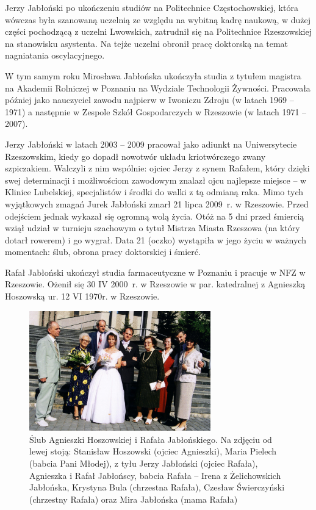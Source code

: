 Jerzy Jabłoński po ukończeniu studiów na Politechnice Częstochowskiej, która wówczas była szanowaną uczelnią ze względu na wybitną kadrę naukową, w dużej części pochodzącą z uczelni Lwowskich, zatrudnił się na Politechnice Rzeszowskiej na stanowisku asystenta. Na tejże uczelni obronił pracę doktorską na temat nagniatania oscylacyjnego. 

W tym samym roku Mirosława Jabłońska ukończyła studia z tytułem magistra na Akademii Rolniczej w Poznaniu na Wydziale Technologii Żywności. Pracowała później jako nauczyciel zawodu najpierw w Iwoniczu Zdroju (w latach 1969 – 1971) a następnie w Zespole Szkół Gospodarczych w Rzeszowie (w latach 1971 – 2007). 

Jerzy Jabłoński w latach 2003 -- 2009 pracował jako adiunkt na Uniwersytecie Rzeszowskim, kiedy go dopadł nowotwór układu kriotwórczego zwany szpiczakiem. Walczyli z nim wspólnie: ojciec Jerzy z synem Rafałem, który dzięki swej determinacji i możliwościom zawodowym znalazł ojcu najlepsze miejsce -- w Klinice Lubelskiej, specjalistów i środki do walki z tą odmianą raka. Mimo tych wyjątkowych zmagań Jurek Jabłoński zmarł 21 lipca 2009~r. w Rzeszowie. Przed odejściem jednak wykazał się ogromną wolą życia.
Otóż na 5 dni przed śmiercią wziął udział w turnieju szachowym o tytuł Mistrza Miasta Rzeszowa (na który dotarł rowerem) i go wygrał. Data 21 (oczko) wystąpiła w jego życiu w ważnych momentach: ślub, obrona pracy doktorskiej i śmierć.

Rafał Jabłoński ukończył studia farmaceutyczne w Poznaniu i pracuje w NFZ w Rzeszowie. Ożenił się 30 IV 2000~r. w Rzeszowie w par. katedralnej z Agnieszką Hoszowską ur. 12 VI 1970r. w Rzeszowie.

\begin{figure}[!hb]
\begin{center}
\includegraphics[width=0.7\textwidth]{zdjecia/slub_rafala_i_agnieszki_jablonskich.jpg}
\caption[Ślub Agnieszki Hoszowskiej z Rafałem Jabłońskim]{Ślub Agnieszki Hoszowskiej i Rafała Jabłońskiego. Na zdjęciu od lewej stoją: Stanisław Hoszowski (ojciec Agnieszki), Maria Pielech (babcia Pani Młodej), z tyłu Jerzy Jabłoński (ojciec Rafała), Agnieszka i Rafał Jabłońscy, babcia Rafała -- Irena z Żelichowskich Jabłońska, Krystyna Bula (chrzestna Rafała), Czesław Świerczyński (chrzestny Rafała) oraz Mira Jabłońska (mama Rafała)}
\label{rys:slub_rafala_i_agnieszki_jablonskich}
\end{center}
\end{figure}

